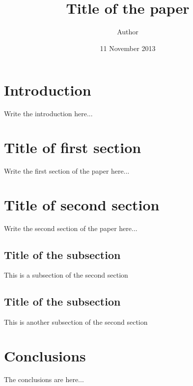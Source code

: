 \documentclass[a4paper,16pt]{article}
\title{Title of the paper}
\author{Author}
\date{11 November 2013}
\begin{document}
\maketitle

\section{Introduction}
Write the introduction here...

\section{Title of first section}
Write the first section of the paper here...

\section{Title of second section}
Write the second section of the paper here...

\subsection{Title of the subsection}
This is a subsection of the second section

\subsection{Title of the subsection}
This is another subsection of the second section

\section{Conclusions}
The conclusions are here...
\end{document}
